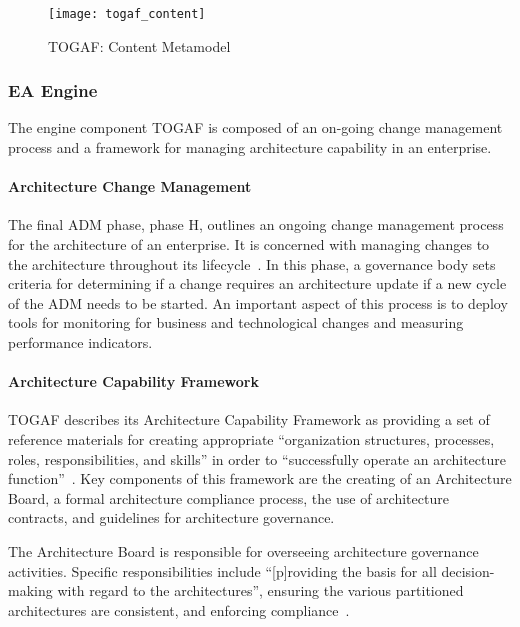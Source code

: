 \begin{figure}
\texttt{[image: togaf\_content]}
\caption[TOGAF: Content Metamodel]{TOGAF: Content Metamodel~\cite[Sec. 34.2]{togaf9.1}}
\label{fig:togaf_content}
\end{figure}

\subsubsection{EA Engine}

The engine component TOGAF is composed of an on-going change management process and a framework for managing architecture capability in an enterprise.

\paragraph*{Architecture Change Management}

The final ADM phase, phase H, outlines an ongoing change management process for the architecture of an enterprise.  It is concerned with managing changes to the architecture throughout its lifecycle~\cite[Ch. 16]{togaf9.1}. In this phase, a governance body sets criteria for determining if a change requires an architecture update if a new cycle of the ADM needs to be started. An important aspect of this process is to deploy tools for monitoring for business and technological changes and measuring performance indicators. 

\paragraph*{Architecture Capability Framework}

TOGAF describes its Architecture Capability Framework as providing a set of reference materials for creating appropriate ``organization structures, processes, roles, responsibilities, and skills'' in order to ``successfully operate an architecture function''~\cite[Sec. 45.1]{togaf9.1}. Key components of this framework are the creating of an Architecture Board, a formal architecture compliance process, the use of architecture contracts, and guidelines for architecture governance. 

The Architecture Board is responsible for overseeing architecture governance activities. Specific responsibilities include ``[p]roviding the basis for all decision-making with regard to the architectures'', ensuring the various partitioned architectures are consistent, and enforcing compliance~\cite[Ch. 47]{togaf9.1}. 

